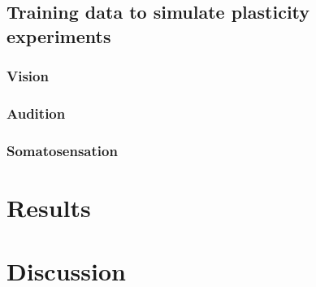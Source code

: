 \documentclass[10pt,letterpaper]{article}
\begin{document}
\subsection{Training data to simulate plasticity experiments}
\subsubsection{Vision}
\subsubsection{Audition}
\subsubsection{Somatosensation}
\section{Results}

\section{Discussion}
\end{document}
